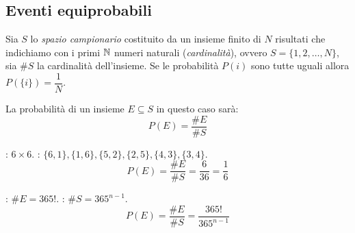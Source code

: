 \subsection{Eventi equiprobabili}%
\label{sub:Eventi equiprobabili}
Sia $S$ lo \emph{spazio campionario} costituito da un insieme finito di $N$
risultati che indichiamo con i primi $\mathbb{N}$ numeri naturali (\emph{cardinalità}),
ovvero $S=\{1,2,\dots,N\}$, sia $\#S$ la cardinalità dell'insieme.
Se le probabilità $P(i)$ sono tutte uguali allora $P(\{i\})=\dfrac{1}{N}$.

La probabilità di un insieme $E\subseteq S$ in questo caso sarà:
\[
  P(E)=\frac{\#E}{\#S}
\]

\begin{esercizio}

  : $6\times6$.
  : $\{6,1\},\{1,6\},\{5,2\},\{2,5\},\{4,3\},\{3,4\}$.
  \[
    P(E)=\frac{\#E}{\#S}=\frac{6}{36}= \frac{1}{6} 
  \]
\end{esercizio}

\begin{esercizio}
  : $\#E=365!$.
  : $\#S=365^{n-1}$. 
  \[
    P(E)=\frac{\#E}{\#S}=\frac{365!}{365^{n-1}}
  \]
\end{esercizio}
